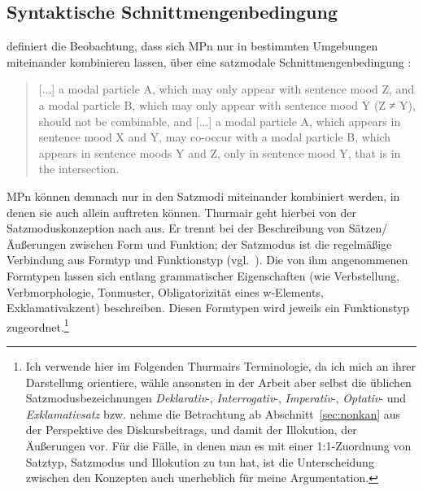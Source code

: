 \subsection{Syntaktische Schnittmengenbedingung}
\label{sec:synschnitt}
\citet[20]{Thurmair1991} definiert die Beobachtung, dass sich MPn nur in bestimmten Umgebungen miteinander kombinieren lassen, über eine satzmodale Schnittmengenbedingung :
\begin{quotation}
[...] a modal particle A, which may only appear with sentence mood Z, and a modal particle B, which may only appear with sentence mood Y (Z ≠ Y), should not be combinable, and [...] a modal particle A, which appears in sentence mood X and Y, may co-occur with a modal particle B, which appears in sentence moods Y and Z, only in sentence mood Y, that is in the intersection. 
\end{quotation}
MPn können demnach nur in den Satzmodi  miteinander kombiniert werden, in denen sie auch allein auftreten können. Thurmair geht hierbei von der Satzmoduskonzeption nach \citet{Altmann1984, Altmann1987} aus. Er trennt bei der Beschreibung von Sätzen/Äußerungen zwischen Form und Funktion; der Satzmodus ist die regelmäßige Verbindung aus Formtyp  und Funktionstyp  (vgl.\ \citealt[22]{Altmann1987}). Die von ihm angenommenen Formtypen lassen sich entlang grammatischer Eigenschaften (wie Verbstellung, Verbmorphologie, Tonmuster, Obligatorizität eines w-Elements, Exklamativakzent) beschreiben. Diesen Formtypen wird je\-weils ein Funktionstyp zugeordnet.\footnote{Ich verwende hier im Folgenden Thurmairs Terminologie, da ich mich an ihrer Darstellung orientiere, wähle ansonsten in der Arbeit aber selbst die üblichen Satzmodusbezeichnungen \textit{Deklarativ}-, \textit{Interrogativ}-, \textit{Imperativ}-, \textit{Optativ}- und \textit{Exklamativsatz} bzw. nehme die Betrachtung ab Abschnitt~\ref{sec:nonkan} aus der Perspektive des Diskursbeitrags, und damit der Illokution, der Äußerungen vor. Für die Fälle, in denen man es mit einer 1:1-Zuordnung von Satztyp, Satzmodus und Illokution zu tun hat, ist die Unterscheidung zwischen den Konzepten auch unerheblich für meine Argumentation.}

